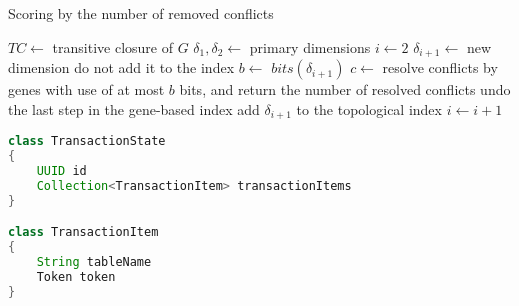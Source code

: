 %
%

\begin{algorithm}
  \caption{Scoring by the number of removed conflicts}
  \label{alg:scoringByNumOfRemovedConflicts}
  \begin{algorithmic}
    \State $TC \gets$ transitive closure of $G$
    \State $\delta_1, \delta_2 \gets$ primary dimensions
    \State $i \gets 2$
      \State $\delta_{i+1} \gets$ new dimension \Comment do not add it to the index
      \State $b \gets$ $bits(\delta_{i+1})$
      \State $c \gets$ resolve conflicts by genes with use of at most $b$ bits, and return the number of resolved
      conflicts
        \State undo the last step in the gene-based index
        \State add $\delta_{i+1}$ to the topological index
        \State $i \gets i+1$
      \EndIf
    \EndWhile   
  \end{algorithmic}
\end{algorithm}


\begin{lstlisting}[language=Java,style=outcode,label={lst:txState},caption={Transaction State data structure}]
class TransactionState
{
    UUID id
    Collection<TransactionItem> transactionItems    
}

class TransactionItem
{
    String tableName
    Token token
}
\end{lstlisting}

